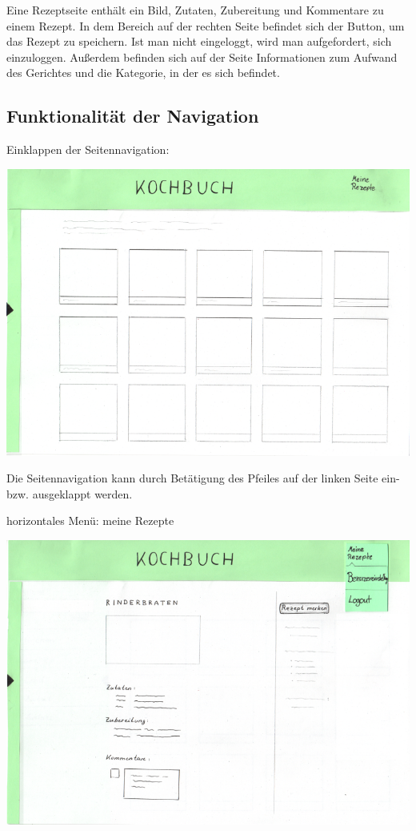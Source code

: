 \documentclass[parskip,10pt,abstracton]{scrartcl}
\begin{document}
Eine Rezeptseite enthält ein Bild, Zutaten, Zubereitung und Kommentare zu einem Rezept. In dem Bereich auf der rechten Seite befindet sich der Button, um das Rezept zu speichern. Ist man nicht eingeloggt, wird man aufgefordert, sich einzuloggen. 
Außerdem befinden sich auf der Seite Informationen zum Aufwand des Gerichtes und die Kategorie, in der es sich befindet. 

\pagebreak
\subsection*{Funktionalität der Navigation}

Einklappen der Seitennavigation:
\begin{center}
\includegraphics[scale=0.4]{Prototyp/home_menuhidden.png}
\end{center}

Die Seitennavigation kann durch Betätigung des Pfeiles auf der linken Seite ein- bzw. ausgeklappt werden. 

horizontales Menü: meine Rezepte
\begin{center}
\includegraphics[scale=0.4]{Prototyp/menu_eigeneRezepte_menuhidden.png}
\end{center}
\end{document}
